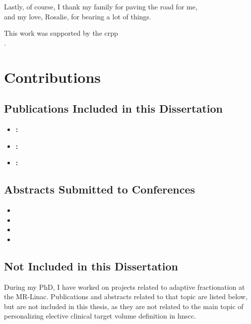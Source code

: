 \documentclass[\relativeRoot/main.tex]{subfiles}
\begin{document}
Lastly, of course, I thank my family for paving the road for me,\\and my love, Rosalie, for bearing a lot of things.

\vspace{4cm}

This work was supported by the \gls{crpp}\\.

\chapter*{Contributions}
\section*{Publications Included in this Dissertation}
\begin{itemize}
    \item \textbf{:} 
    \item \textbf{:} 
    \item \textbf{:} 
\end{itemize}

\section*{Abstracts Submitted to Conferences}
\begin{itemize}
    \item {}
    \item {}
    \item {}
    \item {}
\end{itemize}

\section*{Not Included in this Dissertation}

During my PhD, I have worked on projects related to adaptive fractionation at the MR-Linac. Publications and abstracts related to that topic are listed below, but are not included in this thesis, as they are not related to the main topic of personalizing elective clinical target volume definition in \gls{hnscc}.
\end{document}
